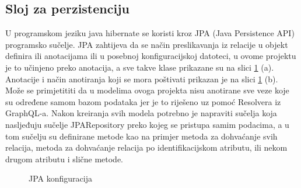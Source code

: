 \documentclass[times, utf8, zavrsni]{fer}
\begin{document}
\subsection{Sloj za perzistenciju}
U programskom jeziku java hibernate se koristi kroz JPA (Java Persistence API) programsko sučelje.
JPA zahtijeva da se način preslikavanja iz relacije u objekt definira ili anotacijama
ili u posebnoj konfiguracijskoj datoteci, u ovome projektu je to učinjeno preko anotacija, a sve takve klase prikazane su na
slici \ref{fig:JPA} (a). Anotacije i način anotiranja koji se mora poštivati prikazan je na slici \ref{fig:JPA} (b). Može se primjetititi
da u modelima ovoga projekta nisu anotirane sve veze koje su određene samom bazom podataka
jer je to riješeno uz pomoć Resolvera iz GraphQL-a. Nakon kreiranja svih modela potrebno je napraviti sučelja koja nasljeđuju sučelje
JPARepository preko kojeg se pristupa samim podacima, a u tom sučelju su definirane metode kao na primjer metoda
za dohvaćanje svih relacija, metoda za dohvaćanje relacija po identifikacijskom atributu, ili nekom drugom atributu
i slične metode.
\begin{figure}[h]
      \centering
      \caption{JPA konfiguracija}
      \label{fig:JPA}
\end{figure}
\end{document}
